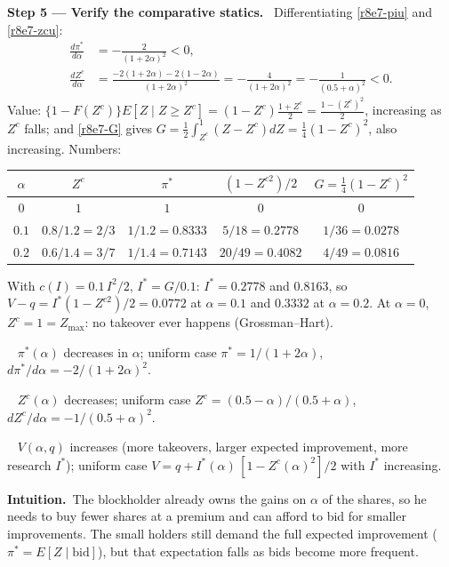 \documentclass[11pt,a4paper]{article}
\newcommand{\step}[2]{\par\medskip\noindent\textbf{Step #1 --- #2.}~}
\newcommand{\intuition}{\par\medskip\noindent\textbf{Intuition.}~}
\newcommand{\answer}[1]{\par\smallskip\noindent\fbox{\textbf{Answer #1.}}~}
\begin{document}
\step{5}{Verify the comparative statics} Differentiating \eqref{r8e7-piu} and \eqref{r8e7-zcu}:
\begin{align}
  \frac{d\pi^*}{d\alpha} &= -\frac{2}{(1+2\alpha)^2}<0, \label{r8e7-dpi}\\
  \frac{dZ^c}{d\alpha} &= \frac{-2(1+2\alpha)-2(1-2\alpha)}{(1+2\alpha)^2}=-\frac{4}{(1+2\alpha)^2}=-\frac{1}{(0.5+\alpha)^2}<0. \label{r8e7-dzc}
\end{align}
Value: $\{1-F(Z^c)\}E[Z\mid Z\ge Z^c]=(1-Z^c)\frac{1+Z^c}{2}=\frac{1-(Z^c)^2}{2}$, increasing as $Z^c$ falls; and \eqref{r8e7-G} gives $G=\tfrac12\int_{Z^c}^1(Z-Z^c)dZ=\tfrac14(1-Z^c)^2$, also increasing. Numbers:
\begin{center}
\begin{tabular}{ccccc}
\toprule
$\alpha$ & $Z^c$ & $\pi^*$ & $(1-Z^{c2})/2$ & $G=\tfrac14(1-Z^c)^2$\\
\midrule
$0$ & $1$ & $1$ & $0$ & $0$\\
$0.1$ & $0.8/1.2=2/3$ & $1/1.2=0.8333$ & $5/18=0.2778$ & $1/36=0.0278$\\
$0.2$ & $0.6/1.4=3/7$ & $1/1.4=0.7143$ & $20/49=0.4082$ & $4/49=0.0816$\\
\bottomrule
\end{tabular}
\end{center}
With $c(I)=0.1\,I^2/2$, $I^*=G/0.1$: $I^*=0.2778$ and $0.8163$, so $V-q=I^*(1-Z^{c2})/2=0.0772$ at $\alpha=0.1$ and $0.3332$ at $\alpha=0.2$. At $\alpha=0$, $Z^c=1=Z_{\max}$: no takeover ever happens (Grossman--Hart).

\answer{(a)} $\pi^*(\alpha)$ decreases in $\alpha$; uniform case $\pi^*=1/(1+2\alpha)$, $d\pi^*/d\alpha=-2/(1+2\alpha)^2$.
\answer{(b)} $Z^c(\alpha)$ decreases; uniform case $Z^c=(0.5-\alpha)/(0.5+\alpha)$, $dZ^c/d\alpha=-1/(0.5+\alpha)^2$.
\answer{(c)} $V(\alpha,q)$ increases (more takeovers, larger expected improvement, more research $I^*$); uniform case $V=q+I^*(\alpha)\,[1-Z^c(\alpha)^2]/2$ with $I^*$ increasing.

\intuition The blockholder already owns the gains on $\alpha$ of the shares, so he needs to buy fewer shares at a premium and can afford to bid for smaller improvements. The small holders still demand the full expected improvement ($\pi^*=E[Z\mid\text{bid}]$), but that expectation falls as bids become more frequent.
\end{document}
